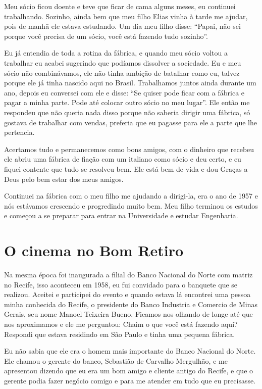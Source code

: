 Meu sócio ficou doente e teve que ficar de cama alguns meses, eu
continuei trabalhando. Sozinho, ainda bem que meu filho Elias vinha à
tarde me ajudar, pois de manhã ele estava estudando. Um dia meu filho
disse: ``Papai, não sei porque você precisa de um sócio, você está
fazendo tudo sozinho''.

Eu já entendia de toda a rotina da fábrica, e quando meu sócio voltou a
trabalhar eu acabei sugerindo que podíamos dissolver a sociedade. Eu e
meu sócio não combinávamos, ele não tinha ambição de batalhar como eu,
talvez porque ele já tinha nascido aqui no Brasil. Trabalhamos juntos
ainda durante um ano, depois eu conversei com ele e disse: ``Se quiser
pode ficar com a fábrica e pagar a minha parte. Pode até colocar outro
sócio no meu lugar''. Ele então me respondeu que não queria nada disso
porque não saberia dirigir uma fábrica, só gostava de trabalhar com
vendas, preferia que eu pagasse para ele a parte que lhe pertencia.

Acertamos tudo e permanecemos como bons amigos, com o dinheiro que
recebeu ele abriu uma fábrica de fiação com um italiano como sócio e deu
certo, e eu fiquei contente que tudo se resolveu bem. Ele está bem de
vida e dou Graças a Deus pelo bem estar dos meus amigos.

Continuei na fábrica com o meu filho me ajudando a dirigi-la, era o ano
de 1957 e nós estávamos crescendo e progredindo muito bem. Meu filho
terminou os estudos e começou a se preparar para entrar na Universidade
e estudar Engenharia.

\chapter{O cinema no Bom Retiro}

Na mesma época foi inaugurada a filial do Banco Nacional do Norte com
matriz no Recife, isso aconteceu em 1958, eu fui convidado para o
banquete que se realizou. Aceitei e participei do evento e quando estava
lá encontrei uma pessoa minha conhecida do Recife, o presidente do Banco
Industria e Comercio de Minas Gerais, seu nome Manoel Teixeira Bueno.
Ficamos nos olhando de longe até que nos aproximamos e ele me perguntou:
Chaim o que você está fazendo aqui? Respondi que estava residindo em São
Paulo e tinha uma pequena fábrica.

Eu não sabia que ele era o homem mais importante do Banco Nacional do
Norte. Ele chamou o gerente do banco, Sebastião de Carvalho Mergulhão, e
me apresentou dizendo que eu era um bom amigo e cliente antigo do
Recife, e que o gerente podia fazer negócio comigo e para me atender em
tudo que eu precisasse.

